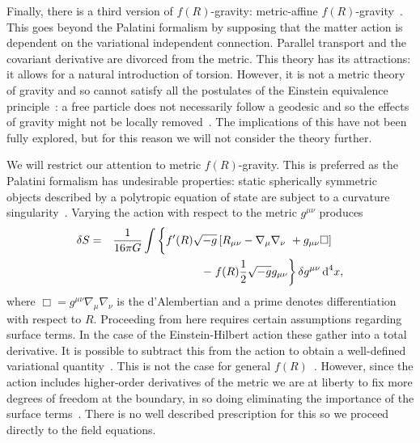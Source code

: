 \documentclass[aps,prd,amsfonts,amssymb,amsmath,nofootinbib,reprint,showpacs]{revtex4-1}
\newcommand{\dd}{\ensuremath{\text{d}}}
\newcommand{\recip}[1]{\ensuremath{\frac{1}{#1}}}
\begin{document}
Finally, there is a third version of $f(R)$-gravity: metric-affine $f(R)$-gravity~\cite{Sotiriou2007, Sotiriou2007b}. This goes beyond the Palatini formalism by supposing that the matter action is dependent on the variational independent connection. Parallel transport and the covariant derivative are divorced from the metric. This theory has its attractions: it allows for a natural introduction of torsion. However, it is not a metric theory of gravity and so cannot satisfy all the postulates of the Einstein equivalence principle~\cite{Will2006}: a free particle does not necessarily follow a geodesic and so the effects of gravity might not be locally removed~\cite{Exirifard2008}. The implications of this have not been fully explored, but for this reason we will not consider the theory further.

We will restrict our attention to metric $f(R)$-gravity. This is preferred as the Palatini formalism has undesirable properties: static spherically symmetric objects described by a polytropic equation of state are subject to a curvature singularity~\cite{Barausse2008b, Barausse2008a}. Varying the action with respect to the metric $g^{\mu\nu}$ produces
\begin{eqnarray}
\delta S & = & \recip{16\pi G}\int\left\{f'(R)\sqrt{-g}\left[R_{\mu\nu} - \nabla_\mu\nabla_\nu\ + g_{\mu\nu}\Box\right] \hphantom{\frac{0}{0}} \vphantom{\frac{0}{0}} \right. \nonumber \\*
 & & - \left. f(R)\recip{2}\sqrt{-g}g_{\mu\nu}\right\}\delta g^{\mu\nu}\,\dd^4x,
\end{eqnarray}
where $\Box = g^{\mu\nu}\nabla_\mu\nabla_\nu$ is the d'Alembertian and a prime denotes differentiation with respect to $R$. Proceeding from here requires certain assumptions regarding surface terms. In the case of the Einstein-Hilbert action these gather into a total derivative. It is possible to subtract this from the action to obtain a well-defined variational quantity~\cite{York1972, Gibbons1977}. This is not the case for general $f(R)$~\cite{Madsen1989}. However, since the action includes higher-order derivatives of the metric we are at liberty to fix more degrees of freedom at the boundary, in so doing eliminating the importance of the surface terms~\cite{Dyer2009a, Sotiriou2010}. There is no well described prescription for this so we proceed directly to the field equations.
\end{document}
